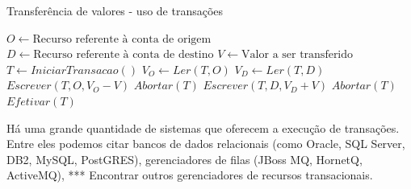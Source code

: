 \documentclass[11pt,twoside,a4paper]{book}
\begin{document}
\begin{algorithm}
\caption{Transferência de valores - uso de transações}
\label{alg:transferencia_valores_transacao}
\begin{algorithmic}[1]
\State $O \gets \text{Recurso referente à conta de origem}$
\State $D \gets \text{Recurso referente à conta de destino}$
\State $V \gets \text{Valor a ser transferido}$
\State $T \gets IniciarTransacao()$
\State $V_O \gets Ler(T, O)$
    \State $V_D \gets Ler(T, D)$
    \State $Escrever(T, O, V_O - V)$
        \State $Abortar(T)$
    \Else
        \State $Escrever(T, D, V_D + V)$
            \State $Abortar(T)$
        \Else
            \State $Efetivar(T)$
        \EndIf
    \EndIf
\EndIf
\end{algorithmic}
\end{algorithm}

Há uma grande quantidade de sistemas que oferecem a execução de transações. Entre eles podemos citar bancos de dados relacionais (como Oracle, SQL Server, DB2, MySQL, PostGRES), gerenciadores de filas (JBoss MQ, HornetQ, ActiveMQ), *** Encontrar outros gerenciadores de recursos transacionais.


\end{document}
